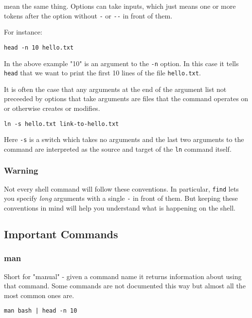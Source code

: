 \documentclass[11pt]{article}
\begin{document}
mean the same thing. Options can take inputs, which just means one
or more tokens after the option without \texttt{-} or \texttt{-{}-} in front of
them.

For instance:

\begin{verbatim}
head -n 10 hello.txt
\end{verbatim}

In the above example "10" is an argument to the \texttt{-n} option. In
this case it tells \texttt{head} that we want to print the first 10 lines
of the file \texttt{hello.txt}.

It is often the case that any arguments at the end of the argument
list not preceeded by options that take arguments are files that
the command operates on or otherwise creates or modifies.

\begin{verbatim}
ln -s hello.txt link-to-hello.txt
\end{verbatim}

Here \texttt{-s} is a switch which takes no arguments and the last two
arguments to the command are interpreted as the source and target
of the \texttt{ln} command itself.

\subsubsection{Warning}
\label{sec:org84e1651}

Not every shell command will follow these conventions. In
particular, \texttt{find} lets you specify \emph{long} arguments with a single
\texttt{-} in front of them. But keeping these conventions in mind will
help you understand what is happening on the shell.

\subsection{Important Commands}
\label{sec:orgb400de6}

\subsubsection{man}
\label{sec:org201c667}

Short for "manual" - given a command name it returns information about
using that command. Some commands are not documented this way but
almost all the most common ones are.

\begin{verbatim}
man bash | head -n 10
\end{verbatim}
\end{document}
